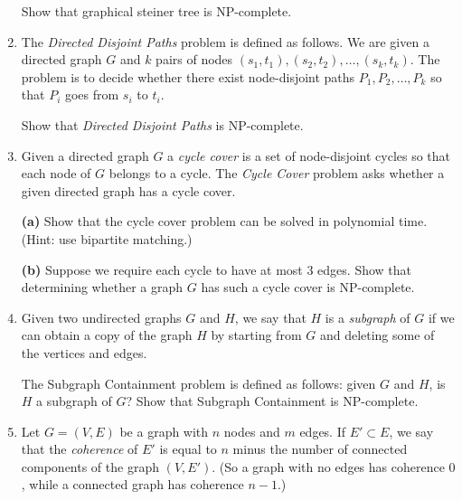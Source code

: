 \documentclass[12pt]{article}
\begin{document}
\begin{enumerate}
Show that {\sc graphical steiner tree} is NP-complete.



\item \label{hw-np-paths}

The {\em Directed Disjoint Paths} problem is defined as follows.
We are given a directed graph $G$ and $k$ pairs of nodes
$(s_1, t_1), (s_2, t_2), \ldots, (s_k, t_k)$.
The problem is to decide whether there exist
node-disjoint paths $P_1, P_2, \ldots, P_k$
so that $P_i$ goes from $s_i$ to $t_i$.

Show that {\em Directed Disjoint Paths} is NP-complete.


\item

Given a directed graph $G$ a {\em cycle cover}
is a set of node-disjoint cycles so that each node of $G$ belongs to a cycle.
The {\em Cycle Cover} problem asks whether a given directed
graph has a cycle cover.

{\bf (a)} Show that the cycle cover problem can be solved in polynomial time.
(Hint: use bipartite matching.)

{\bf (b)\Star} Suppose we require each cycle to have at most $3$ edges.
Show that determining whether a graph $G$ has such a cycle cover is
NP-complete.





\item

Given two undirected graphs $G$ and $H$, we say
that $H$ is a {\em subgraph} of $G$ if we can obtain a copy of
the graph $H$ by starting from $G$ and deleting some
of the vertices and edges.

The {\sc Subgraph Containment} problem is defined as follows:
given $G$ and $H$, is $H$ a subgraph of $G$?
Show that {\sc Subgraph Containment} is NP-complete.


\item

Let $G = (V,E)$ be a graph
with $n$ nodes and $m$ edges.
If $E' \subset E$, we say that the {\em coherence} of
$E'$ is equal to $n$ minus the number of connected
components of the graph $(V,E')$.
(So a graph with no edges has coherence $0$,
while a connected graph has coherence $n-1$.)


\end{enumerate}
\end{document}
